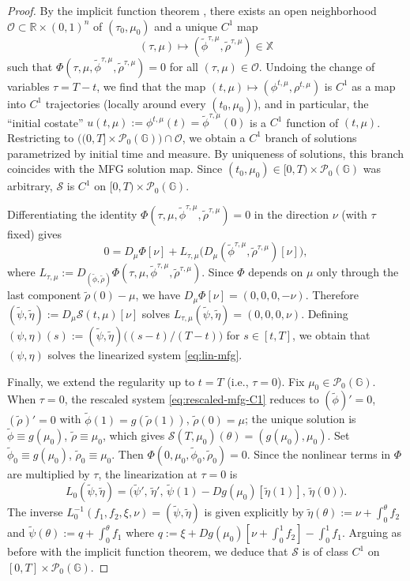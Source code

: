 \documentclass[10pt]{article}
\numberwithin{equation}{section}
\newcommand{\cO}{ \mathcal{O}}
\newcommand{\cP}{ \mathcal{P}}
\newcommand{\cS}{ \mathcal{S}}
\newcommand{\bR}{\mathbb R}
\def\G{\mathbb{G}}
\begin{document}
\begin{proof}
By the implicit function theorem \cite[Thm.~15.1, Cor.~15.1]{Deimling}, there exists an open neighborhood $\cO \subset \bR \times (0,1)^n$ of $(\tau_0, \mu_0)$ and a unique $C^1$ map 
\[
(\tau, \mu) \mapsto (\tilde\phi^{\tau,\mu}, \tilde\rho^{\tau,\mu}) \in \mathbb X
\]
such that $\Phi(\tau, \mu, \tilde\phi^{\tau,\mu}, \tilde\rho^{\tau,\mu}) = 0$ for all $(\tau, \mu) \in \cO$. Undoing the change of variables $\tau = T - t$, we find that the map $(t,\mu) \mapsto (\phi^{t,\mu}, \rho^{t,\mu})$ is $C^1$ as a map into $C^1$ trajectories (locally around every $(t_0, \mu_0)$), and in particular, the ``initial costate'' $u(t,\mu) := \phi^{t,\mu}(t) = \tilde\phi^{\tau,\mu}(0)$ is a $C^1$ function of $(t,\mu)$. Restricting to $\big((0,T] \times \cP_0(\G)\big) \cap \cO$, we obtain a $C^1$ branch of solutions parametrized by initial time and measure. By uniqueness of solutions, this branch coincides with the MFG solution map. Since $(t_0, \mu_0) \in [0,T) \times \cP_0(\G)$ was arbitrary, $\cS$ is $C^1$ on $[0,T) \times \cP_0(\G)$.

Differentiating the identity $\Phi(\tau, \mu, \tilde\phi^{\tau,\mu}, \tilde\rho^{\tau,\mu}) = 0$ in the direction $\nu$ (with $\tau$ fixed) gives
\[
0 = D_\mu \Phi[\nu] + L_{\tau,\mu} \big( D_\mu(\tilde\phi^{\tau,\mu}, \tilde\rho^{\tau,\mu})[\nu] \big),
\]
where $L_{\tau,\mu} := D_{(\tilde\phi, \tilde\rho)} \Phi(\tau, \mu, \tilde\phi^{\tau,\mu}, \tilde\rho^{\tau,\mu})$.
Since $\Phi$ depends on $\mu$ only through the last component $\tilde\rho(0) - \mu$, we have $D_\mu \Phi[\nu] = (0, 0, 0, -\nu)$. Therefore $(\tilde\psi, \tilde\eta) := D_\mu\cS(t,\mu)[\nu]$ solves $L_{\tau,\mu}(\tilde\psi, \tilde\eta) = (0, 0, 0, \nu)$. Defining $(\psi, \eta)(s) := (\tilde\psi, \tilde\eta)\big((s-t)/(T-t)\big)$ for $s \in [t,T]$, we obtain that $(\psi, \eta)$ solves the linearized system \eqref{eq:lin-mfg}.

Finally, we extend the regularity up to $t=T$ (i.e., $\tau=0$). Fix $\mu_0 \in \cP_0(\G)$. When $\tau=0$, the rescaled system \eqref{eq:rescaled-mfg-C1} reduces to $(\tilde\phi)'=0$, $(\tilde\rho)'=0$ with $\tilde\phi(1)=g(\tilde\rho(1))$, $\tilde\rho(0)=\mu$; the unique solution is $\tilde\phi \equiv g(\mu_0)$, $\tilde\rho \equiv \mu_0$, which gives $\cS(T,\mu_0)(\theta)=(g(\mu_0),\mu_0)$. Set $\tilde\phi_0 \equiv g(\mu_0)$, $\tilde\rho_0 \equiv \mu_0$. Then $\Phi(0, \mu_0, \tilde\phi_0, \tilde\rho_0) = 0$. Since the nonlinear terms in $\Phi$ are multiplied by $\tau$, the linearization at $\tau=0$ is
\[
L_0(\tilde\psi, \tilde\eta) = \big( \tilde\psi', \, \tilde\eta', \, \tilde\psi(1) - Dg(\mu_0)[\tilde\eta(1)], \, \tilde\eta(0) \big).
\]
The inverse $L_0^{-1}(f_1, f_2, \xi, \nu) = (\tilde\psi, \tilde\eta)$ is given explicitly by $\tilde\eta(\theta) := \nu + \int_0^\theta f_2$ and $\tilde\psi(\theta) := q + \int_0^\theta f_1$ where $q := \xi + Dg(\mu_0)[\nu + \int_0^1 f_2] - \int_0^1 f_1$. Arguing as before with the implicit function theorem, we deduce that $\cS$ is of class $C^1$ on $[0,T] \times \cP_0(\G)$.
\end{proof}
\end{document}

